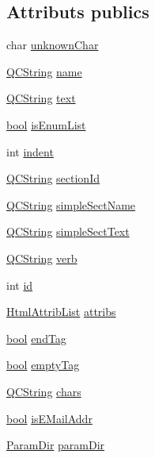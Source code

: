 \subsection*{Attributs publics}
\begin{DoxyCompactItemize}
\item 
char \hyperlink{struct_token_info_a6c01376dcc8a973fa6cfbdb54a71a7cf}{unknown\+Char}
\item 
\hyperlink{class_q_c_string}{Q\+C\+String} \hyperlink{struct_token_info_ad01df4cf228c63091fd14007b7331b8e}{name}
\item 
\hyperlink{class_q_c_string}{Q\+C\+String} \hyperlink{struct_token_info_a55ddc22fdcbb1121681b831154389e07}{text}
\item 
\hyperlink{qglobal_8h_a1062901a7428fdd9c7f180f5e01ea056}{bool} \hyperlink{struct_token_info_a402c7432dcd346501c8e07b8f8fb5df9}{is\+Enum\+List}
\item 
int \hyperlink{struct_token_info_aaa051d5e146647070e9a82f545243e46}{indent}
\item 
\hyperlink{class_q_c_string}{Q\+C\+String} \hyperlink{struct_token_info_a60510e59ef059f69c4c3c44547cdf68d}{section\+Id}
\item 
\hyperlink{class_q_c_string}{Q\+C\+String} \hyperlink{struct_token_info_af3c275c68061c64ea6b5fb513a6d118b}{simple\+Sect\+Name}
\item 
\hyperlink{class_q_c_string}{Q\+C\+String} \hyperlink{struct_token_info_ab1f904a5dcf5fd5ac09be589a7ad734e}{simple\+Sect\+Text}
\item 
\hyperlink{class_q_c_string}{Q\+C\+String} \hyperlink{struct_token_info_a3fec10a272a450f7dd40948b5d6e33b4}{verb}
\item 
int \hyperlink{struct_token_info_ab9c0ff8ec2c582d0e55e80ae35ec6d7e}{id}
\item 
\hyperlink{class_html_attrib_list}{Html\+Attrib\+List} \hyperlink{struct_token_info_a811b08400dcdf6aa65b3fd3149b890c9}{attribs}
\item 
\hyperlink{qglobal_8h_a1062901a7428fdd9c7f180f5e01ea056}{bool} \hyperlink{struct_token_info_a8492fcbbf13ce7dbb7fa8d1eaa9d1e91}{end\+Tag}
\item 
\hyperlink{qglobal_8h_a1062901a7428fdd9c7f180f5e01ea056}{bool} \hyperlink{struct_token_info_afc2259af930fe0364268ed684b558629}{empty\+Tag}
\item 
\hyperlink{class_q_c_string}{Q\+C\+String} \hyperlink{struct_token_info_a7dc1ad1cf0a4e237d7be47b02092d6eb}{chars}
\item 
\hyperlink{qglobal_8h_a1062901a7428fdd9c7f180f5e01ea056}{bool} \hyperlink{struct_token_info_aea756802b18b2753726cbea140961282}{is\+E\+Mail\+Addr}
\item 
\hyperlink{struct_token_info_acc77be95dcb06cac9e3954a1ab62c443}{Param\+Dir} \hyperlink{struct_token_info_a133bc92e279cd9709b8f9b018498d938}{param\+Dir}
\end{DoxyCompactItemize}


